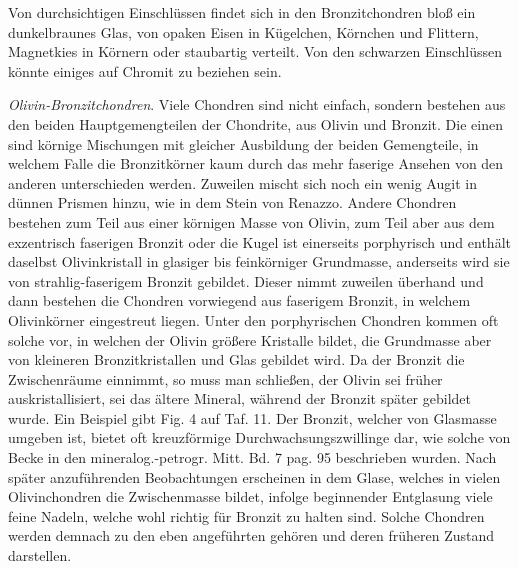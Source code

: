 \documentclass[a4paper, 11pt, oneside, polutonikogreek, german]{article}
\begin{document}
Von durchsichtigen Einschlüssen findet sich in den Bronzitchondren bloß ein dunkelbraunes Glas, von opaken Eisen in Kügelchen, Körnchen und Flittern, Magnetkies in Körnern oder staubartig verteilt. Von den schwarzen Einschlüssen könnte einiges auf Chromit zu beziehen sein.

\emph{Olivin-Bronzitchondren}. Viele Chondren sind nicht einfach, sondern bestehen aus den beiden Hauptgemengteilen der Chondrite, aus Olivin und Bronzit. Die einen sind körnige Mischungen mit gleicher Ausbildung der beiden Gemengteile, in welchem Falle die Bronzitkörner kaum durch das mehr faserige Ansehen von den anderen unterschieden werden. Zuweilen mischt sich noch ein wenig Augit in dünnen Prismen hinzu, wie in dem Stein von Renazzo. Andere Chondren bestehen zum Teil aus einer körnigen Masse von Olivin, zum Teil aber aus dem exzentrisch faserigen Bronzit oder die Kugel ist einerseits porphyrisch und enthält daselbst Olivinkristall in glasiger bis feinkörniger Grundmasse, anderseits wird sie von strahlig-faserigem Bronzit gebildet. Dieser nimmt zuweilen überhand und dann bestehen die Chondren vorwiegend aus faserigem Bronzit, in welchem Olivinkörner eingestreut liegen. Unter den porphyrischen Chondren kommen oft solche vor, in welchen der Olivin größere Kristalle bildet, die Grundmasse aber von kleineren Bronzitkristallen und Glas gebildet wird. Da der Bronzit die Zwischenräume einnimmt, so muss man schließen, der Olivin sei früher auskristallisiert, sei das ältere Mineral, während der Bronzit später gebildet wurde. Ein Beispiel gibt Fig. 4 auf Taf. 11. Der Bronzit, welcher von Glasmasse umgeben ist, bietet oft kreuzförmige Durchwachsungszwillinge dar, wie solche von Becke in den mineralog.-petrogr. Mitt. Bd. 7 pag. 95 beschrieben wurden. Nach später anzuführenden Beobachtungen erscheinen in dem Glase, welches in vielen Olivinchondren die Zwischenmasse bildet, infolge beginnender Entglasung viele feine Nadeln, welche wohl richtig für Bronzit zu halten sind. Solche Chondren werden demnach zu den eben angeführten gehören und deren früheren Zustand darstellen.
\end{document}
